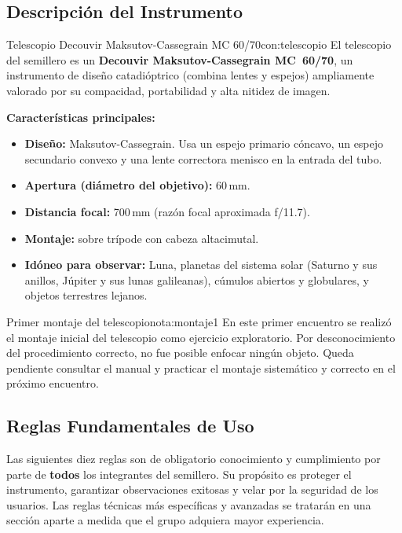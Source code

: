 \subsection{Descripción del Instrumento}

\begin{concepto}{Telescopio Decouvir Maksutov-Cassegrain MC 60/70}{con:telescopio}
    El telescopio del semillero es un \textbf{Decouvir Maksutov-Cassegrain MC~60/70},
    un instrumento de diseño catadióptrico (combina lentes y espejos) ampliamente
    valorado por su compacidad, portabilidad y alta nitidez de imagen.

    \medskip
    \textbf{Características principales:}
    \begin{itemize}[leftmargin=1.5em]
        \item \textbf{Diseño:} Maksutov-Cassegrain. Usa un espejo primario cóncavo,
              un espejo secundario convexo y una lente correctora menisco en la
              entrada del tubo.
        \item \textbf{Apertura (diámetro del objetivo):} 60\,mm.
        \item \textbf{Distancia focal:} 700\,mm (razón focal aproximada f/11.7).
        \item \textbf{Montaje:} sobre trípode con cabeza altacimutal.
        \item \textbf{Idóneo para observar:} Luna, planetas del sistema solar
              (Saturno y sus anillos, Júpiter y sus lunas galileanas), cúmulos
              abiertos y globulares, y objetos terrestres lejanos.
    \end{itemize}
\end{concepto}

\begin{nota}{Primer montaje del telescopio}{nota:montaje1}
    En este primer encuentro se realizó el montaje inicial del telescopio como
    ejercicio exploratorio. Por desconocimiento del procedimiento correcto, no
    fue posible enfocar ningún objeto. Queda pendiente consultar el manual y
    practicar el montaje sistemático y correcto en el próximo encuentro.
\end{nota}

\subsection{Reglas Fundamentales de Uso}

Las siguientes diez reglas son de obligatorio conocimiento y cumplimiento por parte de
\textbf{todos} los integrantes del semillero. Su propósito es proteger el instrumento,
garantizar observaciones exitosas y velar por la seguridad de los usuarios.
Las reglas técnicas más específicas y avanzadas se tratarán en una sección aparte a
medida que el grupo adquiera mayor experiencia.

